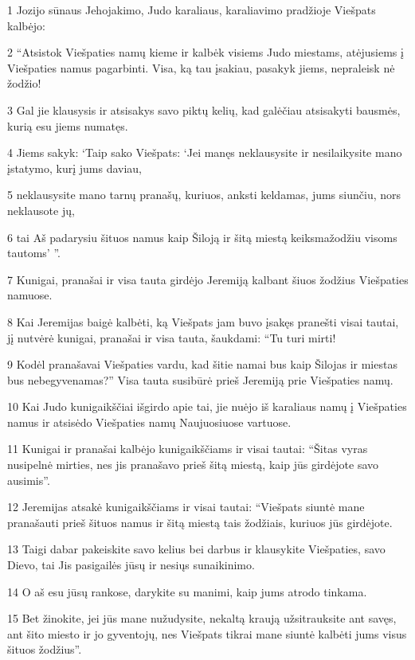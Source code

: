 \par 1 Jozijo sūnaus Jehojakimo, Judo karaliaus, karaliavimo pradžioje Viešpats kalbėjo: 
\par 2 “Atsistok Viešpaties namų kieme ir kalbėk visiems Judo miestams, atėjusiems į Viešpaties namus pagarbinti. Visa, ką tau įsakiau, pasakyk jiems, nepraleisk nė žodžio! 
\par 3 Gal jie klausysis ir atsisakys savo piktų kelių, kad galėčiau atsisakyti bausmės, kurią esu jiems numatęs. 
\par 4 Jiems sakyk: ‘Taip sako Viešpats: ‘Jei manęs neklausysite ir nesilaikysite mano įstatymo, kurį jums daviau, 
\par 5 neklausysite mano tarnų pranašų, kuriuos, anksti keldamas, jums siunčiu, nors neklausote jų, 
\par 6 tai Aš padarysiu šituos namus kaip Šiloją ir šitą miestą keiksmažodžiu visoms tautoms’ ”. 
\par 7 Kunigai, pranašai ir visa tauta girdėjo Jeremiją kalbant šiuos žodžius Viešpaties namuose. 
\par 8 Kai Jeremijas baigė kalbėti, ką Viešpats jam buvo įsakęs pranešti visai tautai, jį nutvėrė kunigai, pranašai ir visa tauta, šaukdami: “Tu turi mirti! 
\par 9 Kodėl pranašavai Viešpaties vardu, kad šitie namai bus kaip Šilojas ir miestas bus nebegyvenamas?” Visa tauta susibūrė prieš Jeremiją prie Viešpaties namų. 
\par 10 Kai Judo kunigaikščiai išgirdo apie tai, jie nuėjo iš karaliaus namų į Viešpaties namus ir atsisėdo Viešpaties namų Naujuosiuose vartuose. 
\par 11 Kunigai ir pranašai kalbėjo kunigaikščiams ir visai tautai: “Šitas vyras nusipelnė mirties, nes jis pranašavo prieš šitą miestą, kaip jūs girdėjote savo ausimis”. 
\par 12 Jeremijas atsakė kunigaikščiams ir visai tautai: “Viešpats siuntė mane pranašauti prieš šituos namus ir šitą miestą tais žodžiais, kuriuos jūs girdėjote. 
\par 13 Taigi dabar pakeiskite savo kelius bei darbus ir klausykite Viešpaties, savo Dievo, tai Jis pasigailės jūsų ir nesiųs sunaikinimo. 
\par 14 O aš esu jūsų rankose, darykite su manimi, kaip jums atrodo tinkama. 
\par 15 Bet žinokite, jei jūs mane nužudysite, nekaltą kraują užsitrauksite ant savęs, ant šito miesto ir jo gyventojų, nes Viešpats tikrai mane siuntė kalbėti jums visus šituos žodžius”. 
